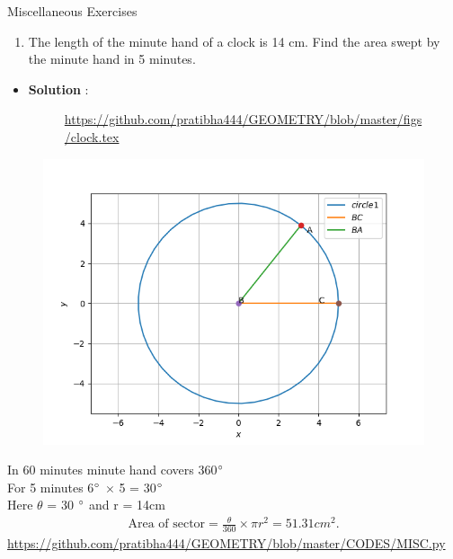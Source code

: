 \begin{frame}{Miscellaneous Exercises}
\begin{enumerate}
\conti
\item The length of the
minute hand of a clock is 14 cm. Find the area
swept by the minute hand in 5 minutes.\\
\seti
\end{enumerate}
\begin{itemize}
\item \textbf{Solution} :
\begin{figure}[!ht]
\resizebox{0.2\linewidth}{!}
{

}
\url{https://github.com/pratibha444/GEOMETRY/blob/master/figs/clock.tex}
\end{figure}


\end{itemize}
\end{frame}
\begin{frame}
\begin{figure}
\includegraphics[scale=.6]{./CODES/misc.png}
\end{figure}
\end{frame}
\begin{frame}

 In 60 minutes minute hand covers  360$\degree$\\
For 5 minutes 6$\degree$ $\times$ 5 = 30$\degree$\\ 
Here $\theta$ = 30 $\degree$ and r = 14cm\\

\begin{align*}
	\text{Area of sector} = \frac{\theta}{360} \times \pi r^2
	=51.31cm^2.
\end{align*}   
\url{https://github.com/pratibha444/GEOMETRY/blob/master/CODES/MISC.py}            
\end{frame}